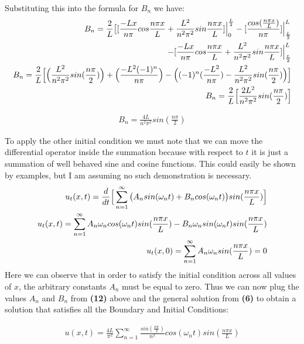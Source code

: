 \documentclass{article}
\begin{document}
Substituting this into the formula for $B_n$ we have:
\begin{equation}
\begin{aligned}
B_n = \frac{2}{L}\big{[}[ \frac{-Lx}{n\pi}cos\frac{n\pi x}{L} + \frac{L^2}{n^2\pi^2}sin\frac{n\pi x}{L}]\Big{|}^{\frac{L}{2}}_0 -[\frac{cos(\frac{n\pi x}{L})}{n\pi}]\Big{|}^L_{\frac{L}{2}}\\
-[\frac{-Lx}{n\pi}cos\frac{n\pi x}{L} + \frac{L^2}{n^2\pi^2}sin\frac{n\pi x}{L}]\Big{|}^L_{\frac{L}{2}}\\
B_n = \frac{2}{L}\Big{[}\Big{(}\frac{L^2}{n^2\pi^2}sin(\frac{n\pi}{2})\Big{)} + \Big{(}\frac{-L^2(-1)^n}{n\pi}\Big{)} - \Big{(}(-1)^n(\frac{-L^2}{n\pi}) - \frac{L^2}{n^2\pi^2}sin(\frac{n\pi}{2})\Big{)}\Big{]}\\
B_n = \frac{2}{L}\Big{[}\frac{2L^2}{n^2\pi^2}sin(\frac{n\pi}{2})\Big{]}
\end{aligned}
\end{equation}
\begin{tcolorbox}[minipage,colback=white,arc=0pt,outer arc=0pt]
\begin{equation}
\begin{aligned}
B_n = \frac{4L}{n^2\pi^2}sin(\frac{n\pi}{2})
\end{aligned}
\end{equation}
\end{tcolorbox}
To apply the other initial condition we must note that we can move the differential operator inside the summation because with respect to $t$ it is just a summation of well behaved sine and cosine functions. This could easily be shown by examples, but I am assuming no such demonstration is necessary.
\begin{equation}
\begin{aligned}
u_t(x,t)= \frac{d}{dt}\Big{[}\sum^{\infty}_{n=1}\big{(}A_nsin(\omega_n t) + B_ncos(\omega_n t)\big{)}sin(\frac{n\pi x}{L})\Big{]}\\
u_t(x,t) = \sum^{\infty}_{n=1}A_n\omega_ncos(\omega_n t)sin(\frac{n\pi x}{L}) - B_n\omega_nsin(\omega_n t)sin(\frac{n\pi x}{L})\\
u_t(x,0) = \sum^{\infty}_{n=1}A_n\omega_nsin(\frac{n\pi x}{L})=0
\end{aligned}
\end{equation}
Here we can observe that in order to satisfy the initial condition across all values of $x$, the arbitrary constants $A_n$ must be equal to zero. Thus we can now plug the values $A_n$ and $B_n$ from \textbf{(12)} above and the general solution from \textbf{(6)} to obtain a solution that satisfies all the Boundary and Initial Conditions:
\begin{tcolorbox}[minipage,colback=white,arc=0pt,outer arc=0pt]
\begin{equation}
\begin{aligned}
u(x,t) = \frac{4L}{\pi^2}\sum^{\infty}_{n=1}\frac{sin(\frac{n\pi}{2})}{n^2}cos(\omega_n t)sin(\frac{n\pi x}{L})
\end{aligned}
\end{equation}
\end{tcolorbox}
\end{document}
